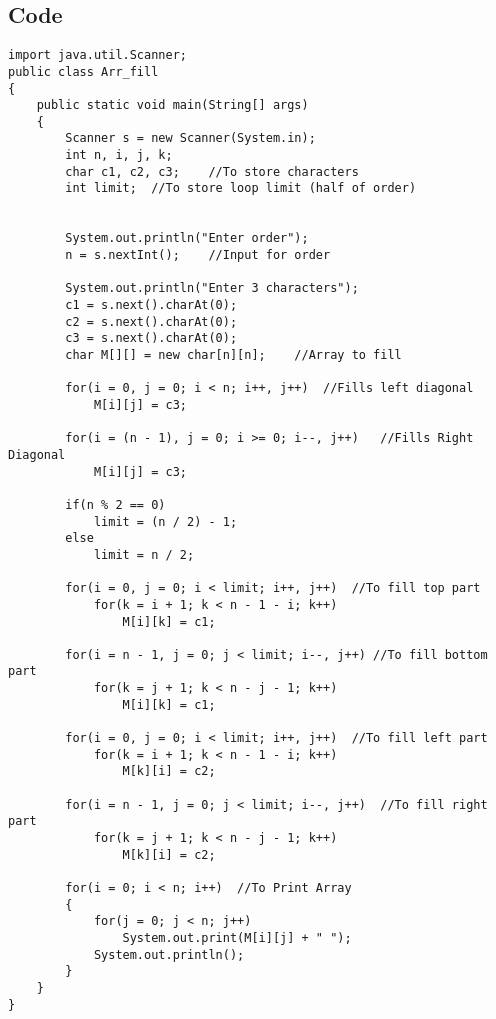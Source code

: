 \documentclass[ProgrammingAssignment.tex]{subfiles}
\begin{document}
\subsection{Code}
\begin{lstlisting}
import java.util.Scanner;
public class Arr_fill
{
	public static void main(String[] args)
	{
		Scanner s = new Scanner(System.in);
		int n, i, j, k;
		char c1, c2, c3;	//To store characters
		int limit;	//To store loop limit (half of order)
		
		
		System.out.println("Enter order");
		n = s.nextInt();	//Input for order
		
		System.out.println("Enter 3 characters");
		c1 = s.next().charAt(0);
		c2 = s.next().charAt(0);
		c3 = s.next().charAt(0);
		char M[][] = new char[n][n];	//Array to fill
		
		for(i = 0, j = 0; i < n; i++, j++)	//Fills left diagonal
			M[i][j] = c3;
			
		for(i = (n - 1), j = 0; i >= 0; i--, j++)	//Fills Right Diagonal
			M[i][j] = c3;
		
		if(n % 2 == 0)
			limit = (n / 2) - 1;
		else
			limit = n / 2;
		
		for(i = 0, j = 0; i < limit; i++, j++)	//To fill top part
			for(k = i + 1; k < n - 1 - i; k++)
				M[i][k] = c1;
		
		for(i = n - 1, j = 0; j < limit; i--, j++) //To fill bottom part
			for(k = j + 1; k < n - j - 1; k++)
				M[i][k] = c1;
		
		for(i = 0, j = 0; i < limit; i++, j++)	//To fill left part
			for(k = i + 1; k < n - 1 - i; k++)
				M[k][i] = c2;
		
		for(i = n - 1, j = 0; j < limit; i--, j++)	//To fill right part
			for(k = j + 1; k < n - j - 1; k++)
				M[k][i] = c2;
		
		for(i = 0; i < n; i++)	//To Print Array
		{
			for(j = 0; j < n; j++)
				System.out.print(M[i][j] + " ");
			System.out.println();
		}
	}
}
\end{lstlisting}
\end{document}

